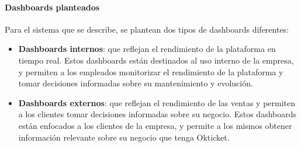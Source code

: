\newpage{}
\paragraph{Dashboards planteados}
Para el sistema que se describe, se plantean dos tipos de dashboards diferentes:

\begin{itemize}
	\item \textbf{Dashboards internos}: que reflejan el rendimiento de la plataforma en tiempo real.
		Estos dashboards están destinados al uso interno de la empresa, y permiten a los
		empleados monitorizar el rendimiento de la plataforma y tomar decisiones informadas
		sobre su mantenimiento y evolución.
	\item \textbf{Dashboards externos}: que reflejan el rendimiento de las ventas y permiten a los
	    clientes tomar decisiones informadas sobre su negocio. Estos dashboards están enfocados
		a los clientes de la empresa, y permite a los mismos obtener información relevante sobre
		su negocio que tenga Okticket.
\end{itemize}




